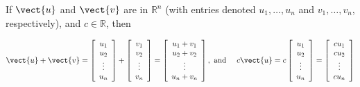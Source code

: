 \begin{example}
    If $\vect{u}$ and $\vect{v}$ are in $\mathbb{R}^n$ (with entries denoted $u_1, \ldots, u_n$ and $v_1, \ldots, v_n$, respectively), and $c \in \mathbb{R}$, then

    \[
    \begin{aligned}
    & \vect{u} + \vect{v} = {\left[\begin{array}{c}
    u_1 \\
    u_2 \\
    \vdots \\
    u_n
    \end{array}\right] + \left[\begin{array}{c}
    v_1 \\
    v_2 \\
    \vdots \\
    v_n
    \end{array}\right] = \left[\begin{array}{c}
    u_1 + v_1 \\
    u_2 + v_2 \\
    \vdots \\
    u_n + v_n
    \end{array}\right], \text { and } } 
    & c \vect{u} = c\left[\begin{array}{c}
    u_1 \\
    u_2 \\
    \vdots \\
    u_n
    \end{array}\right] = \left[\begin{array}{c}
    c u_1 \\
    c u_2 \\
    \vdots \\
    c u_n
    \end{array}\right]
    \end{aligned}
    \]   
\end{example}

